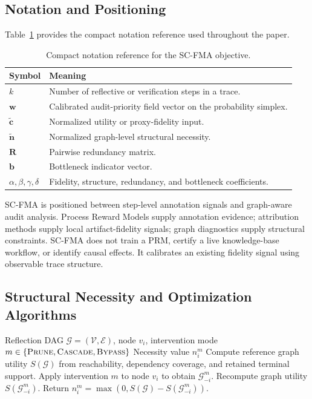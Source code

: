 \documentclass[a4paper,fleqn]{cas-sc}
\begin{document}
\subsection{Notation and Positioning}
\label{app:notation-positioning}

Table~\ref{tab:supp-notation} provides the compact notation reference used throughout the paper.

\begin{table}[ht]
\caption{Compact notation reference for the SC-FMA objective.}
\label{tab:supp-notation}
\centering
\small
\begin{tabular}{ll}
\toprule
\textbf{Symbol} & \textbf{Meaning} \\
\midrule
$k$ & Number of reflective or verification steps in a trace. \\
$\mathbf{w}$ & Calibrated audit-priority field vector on the probability simplex. \\
$\tilde{\mathbf{c}}$ & Normalized utility or proxy-fidelity input. \\
$\tilde{\mathbf{n}}$ & Normalized graph-level structural necessity. \\
$\mathbf{R}$ & Pairwise redundancy matrix. \\
$\mathbf{b}$ & Bottleneck indicator vector. \\
$\alpha,\beta,\gamma,\delta$ & Fidelity, structure, redundancy, and bottleneck coefficients. \\
\bottomrule
\end{tabular}
\end{table}

SC-FMA is positioned between step-level annotation signals and graph-aware audit analysis. Process Reward Models supply annotation evidence; attribution methods supply local artifact-fidelity signals; graph diagnostics supply structural constraints. SC-FMA does not train a PRM, certify a live knowledge-base workflow, or identify causal effects. It calibrates an existing fidelity signal using observable trace structure.

\subsection{Structural Necessity and Optimization Algorithms}
\label{app:algorithms}

\begin{algorithm}[ht]
\caption{Structural Necessity Computation}
\label{alg:supp-structural-necessity}
\begin{algorithmic}[1]
\Require Reflection DAG $\mathcal{G}=(\mathcal{V},\mathcal{E})$, node $v_i$, intervention mode $m\in\{\textsc{Prune},\textsc{Cascade},\textsc{Bypass}\}$
\Ensure Necessity value $n_i^{m}$
\State Compute reference graph utility $S(\mathcal{G})$ from reachability, dependency coverage, and retained terminal support.
\State Apply intervention $m$ to node $v_i$ to obtain $\mathcal{G}_{-i}^{m}$.
\State Recompute graph utility $S(\mathcal{G}_{-i}^{m})$.
\State Return $n_i^{m}=\max(0,S(\mathcal{G})-S(\mathcal{G}_{-i}^{m}))$.
\end{algorithmic}
\end{algorithm}
\end{document}
